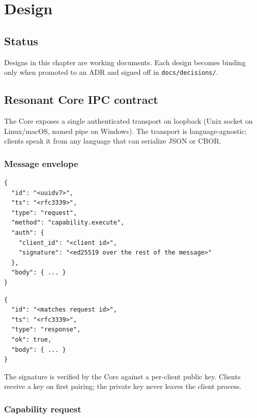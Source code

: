 
\chapter{Design}

\section{Status}

Designs in this chapter are working documents. Each design becomes
binding only when promoted to an ADR and signed off in
\texttt{docs/decisions/}.

\section{Resonant Core IPC contract}

The Core exposes a single authenticated transport on loopback
(Unix socket on Linux/macOS, named pipe on Windows). The transport
is language-agnostic; clients speak it from any language that can
serialize JSON or CBOR.

\subsection{Message envelope}

\begin{lstlisting}[language=rccosjson,caption={Request envelope.}]
{
  "id": "<uuidv7>",
  "ts": "<rfc3339>",
  "type": "request",
  "method": "capability.execute",
  "auth": {
    "client_id": "<client id>",
    "signature": "<ed25519 over the rest of the message>"
  },
  "body": { ... }
}
\end{lstlisting}

\begin{lstlisting}[language=rccosjson,caption={Response envelope.}]
{
  "id": "<matches request id>",
  "ts": "<rfc3339>",
  "type": "response",
  "ok": true,
  "body": { ... }
}
\end{lstlisting}

The signature is verified by the Core against a per-client
public key. Clients receive a key on first pairing; the private
key never leaves the client process.

\subsection{Capability request}

